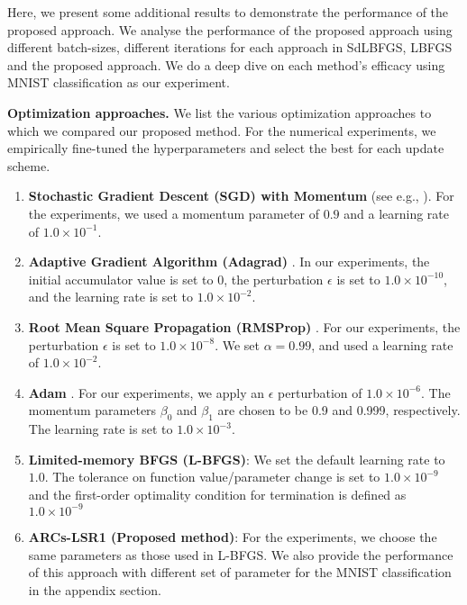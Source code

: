 Here, we present some additional results to demonstrate the performance of the proposed approach. We analyse the performance of the proposed approach using different batch-sizes, different iterations for each approach in SdLBFGS, LBFGS and the proposed approach. We do a deep dive on each method's efficacy using MNIST classification as our experiment.




\noindent \textbf{Optimization approaches.} 
We list the various optimization approaches to which we compared our proposed method.  For the numerical experiments, we empirically fine-tuned the hyperparameters and select the best for each update scheme.

\begin{enumerate}

\item \textbf{Stochastic Gradient Descent (SGD) with Momentum}  (see e.g., \cite{Qia99}).
For the experiments, we used a momentum parameter of $0.9$ and a learning rate of $1.0 \times 10^{-1}$.

\item 
\textbf{Adaptive Gradient Algorithm (Adagrad)} 
\cite{duchi2011adaptive}.  
In our experiments, the initial accumulator value is set to 0, the perturbation $\epsilon$ is set to $1.0 \times 10^{-10}$, and the learning rate is set to $1.0 \times 10^{-2}$.


\item \textbf{Root Mean Square Propagation (RMSProp)} 
\cite{hinton2012neural}.  For our experiments, the perturbation $\epsilon$ is set  to $1.0 \times 10^{-8}$. We set $\alpha = 0.99$, and used a learning rate of $1.0 \times 10^{-2}$.

\item \textbf{Adam} 
\cite{kingma2014adam}. For  our experiments, we apply an $\epsilon$ perturbation of $1.0 \times 10^{-6}$. The momentum parameters $\beta_0$ and $\beta_1$ are chosen to be 0.9 and 0.999, respectively.  The learning rate is set to $1.0 \times 10^{-3}$. 


\item \textbf{Limited-memory BFGS (L-BFGS)}: We set the default learning rate to $1.0$. The tolerance on function value/parameter change is set to $1.0 \times 10^{-9}$ and the first-order optimality condition for termination is defined as $1.0 \times 10^{-9}$

\item  \textbf{ARCs-LSR1 (Proposed method)}: For the experiments, we choose the same parameters as those used in L-BFGS. We also provide the performance of this approach with different set of parameter for the MNIST classification in the appendix section.


\end{enumerate}